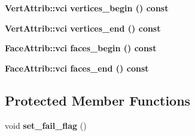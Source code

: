 \begin{CompactItemize}
\item 
\bf{Vert\-Attrib::vci} \textbf{vertices\_\-begin} () const \label{classASCbase_1_1geometry_1_1SimpleTrimeshThree_e80531bbf6af55529137b553dc205a61}

\item 
\bf{Vert\-Attrib::vci} \textbf{vertices\_\-end} () const \label{classASCbase_1_1geometry_1_1SimpleTrimeshThree_a45c5de311686b10920adbdb4ede817a}

\item 
\bf{Face\-Attrib::vci} \textbf{faces\_\-begin} () const \label{classASCbase_1_1geometry_1_1SimpleTrimeshThree_647b6b8412d82b702e5fe4b07ecf07d9}

\item 
\bf{Face\-Attrib::vci} \textbf{faces\_\-end} () const \label{classASCbase_1_1geometry_1_1SimpleTrimeshThree_daf2e57ad4a17d02afaa8e62da5e2ce2}

\end{CompactItemize}
\subsection*{Protected Member Functions}
\begin{CompactItemize}
\item 
void \textbf{set\_\-fail\_\-flag} ()\label{classASCbase_1_1geometry_1_1SimpleTrimeshThree_0aee50a52a6b7dd7eb12de42e516f724}

\end{CompactItemize}
